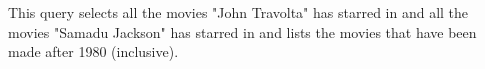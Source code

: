 This query selects all the movies "John Travolta" has starred in and all the movies "Samadu Jackson" has starred in and lists the movies that have been made after 1980 (inclusive).